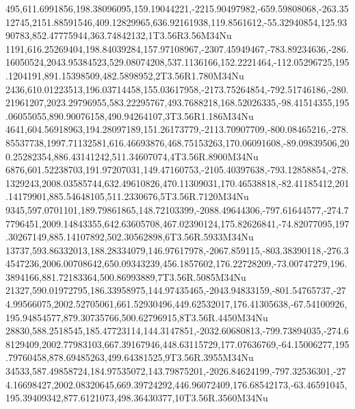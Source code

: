 495,611.6991856,198.38096095,159.19044221,-2215.90497982,-659.59808068,-263.3512745,2151.88591546,409.12829965,636.92161938,119.8561612,-55.32940854,125.9390783,852.47775944,363.74842132,1T3.56R3.56M34Nu
1191,616.25269404,198.84039284,157.97108967,-2307.45949467,-783.89234636,-286.16050524,2043.95384523,529.08074208,537.1136166,152.2221464,-112.05296725,195.1204191,891.15398509,482.5898952,2T3.56R1.780M34Nu
2436,610.01223513,196.03714458,155.03617958,-2173.75264854,-792.51746186,-280.21961207,2023.29796955,583.22295767,493.7688218,168.52026335,-98.41514355,195.06055055,890.90076158,490.94264107,3T3.56R1.186M34Nu
4641,604.56918963,194.28097189,151.26173779,-2113.70907709,-800.08465216,-278.85537738,1997.71132581,616.46693876,468.75153263,170.06091608,-89.09839506,200.25282354,886.43141242,511.34607074,4T3.56R.8900M34Nu
6876,601.52238703,191.97207031,149.47160753,-2105.40397638,-793.12858854,-278.1329243,2008.03585744,632.49610826,470.11309031,170.46538818,-82.41185412,201.14179901,885.54648105,511.2330676,5T3.56R.7120M34Nu
9345,597.0701101,189.79861865,148.72103399,-2088.49644306,-797.61644577,-274.77796451,2009.14843355,642.63605708,467.02390124,175.82626841,-74.82077095,197.30267149,885.14107892,502.30562898,6T3.56R.5933M34Nu
13737,593.86332013,188.28334079,146.97617978,-2067.859115,-803.38390118,-276.34547236,2006.00708642,650.09343239,456.1857602,176.22728209,-73.00747279,196.3894166,881.72183364,500.86993889,7T3.56R.5085M34Nu
21327,590.01972795,186.33958975,144.97435465,-2043.94833159,-801.54765737,-274.99566075,2002.52705061,661.52930496,449.62532017,176.41305638,-67.54100926,195.94854577,879.30735766,500.62796915,8T3.56R.4450M34Nu
28830,588.2518545,185.47723114,144.3147851,-2032.60680813,-799.73894035,-274.68129409,2002.77983103,667.39167946,448.63115729,177.07636769,-64.15006277,195.79760458,878.69485263,499.64381525,9T3.56R.3955M34Nu
34533,587.49858724,184.97535072,143.79875201,-2026.84624199,-797.32536301,-274.16698427,2002.08320645,669.39724292,446.96072409,176.68542173,-63.46591045,195.39409342,877.6121073,498.36430377,10T3.56R.3560M34Nu
